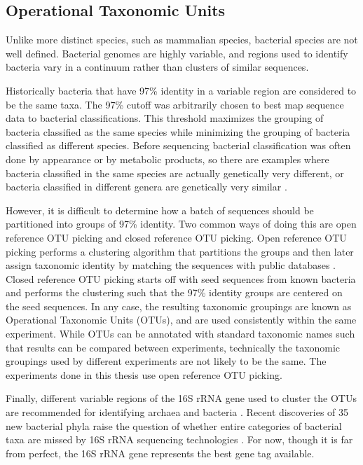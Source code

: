 \subsection{Operational Taxonomic Units}
Unlike more distinct species, such as mammalian species, bacterial species are not well defined. Bacterial genomes are highly variable, and regions used to identify bacteria vary in a continuum rather than clusters of similar sequences.

Historically bacteria that have 97\% identity in a variable region are considered to be the same taxa. The 97\% cutoff was arbitrarily chosen to best map sequence data to bacterial classifications. This threshold maximizes the grouping of bacteria classified as the same species while minimizing the grouping of bacteria classified as different species. Before sequencing bacterial classification was often done by appearance or by metabolic products, so there are examples where bacteria classified in the same species are actually genetically very different, or bacteria classified in different genera are genetically very similar \cite{ciccarelli2006toward}.

However, it is difficult to determine how a batch of sequences should be partitioned into groups of 97\% identity. Two common ways of doing this are open reference OTU picking \cite{rideout2014subsampled} and closed reference OTU picking. Open reference OTU picking performs a clustering algorithm that partitions the groups and then later assign taxonomic identity by matching the sequences with public databases \cite{edgar2013uparse}. Closed reference OTU picking starts off with seed sequences from known bacteria and performs the clustering such that the 97\% identity groups are centered on the seed sequences. In any case, the resulting taxonomic groupings are known as Operational Taxonomic Units (OTUs), and are used consistently within the same experiment. While OTUs can be annotated with standard taxonomic names such that results can be compared between experiments, technically the taxonomic groupings used by different experiments are not likely to be the same. The experiments done in this thesis use open reference OTU picking.

Finally, different variable regions of the 16S rRNA gene used to cluster the OTUs are recommended for identifying archaea and bacteria \cite{kim2011evaluation}. Recent discoveries of 35 new bacterial phyla raise the question of whether entire categories of bacterial taxa are missed by 16S rRNA sequencing technologies \cite{hug2016new}. For now, though it is far from perfect, the 16S rRNA gene represents the best gene tag available.

